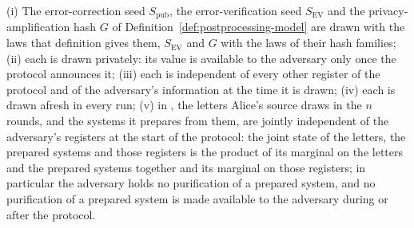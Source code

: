 \begin{assumption}\label{ass:seed}
(i) The error-correction seed $S_{\mathrm{pub}}$, the error-verification seed
$S_{\mathrm{EV}}$ and the privacy-amplification hash $G$ of
Definition~\ref{def:postprocessing-model} are drawn with the laws that
definition gives them, $S_{\mathrm{EV}}$ and $G$ with the laws of their hash
families;
(ii) each is drawn privately: its value is available to the adversary only
once the protocol announces it;
(iii) each is independent of every other register of the protocol and of the
adversary's information at the time it is drawn;
(iv) each is drawn afresh in every run;
(v) in , the letters Alice's source draws in the
$n$ rounds, and the systems it prepares from them, are jointly independent of
the adversary's registers at the start of the protocol: the joint state of
the letters, the prepared systems and those registers is the product of its
marginal on the letters and the prepared systems together and its marginal on
those registers; in particular the adversary holds no purification of a
prepared system, and no purification of a prepared system is made available
to the adversary during or after the protocol.
\end{assumption}
